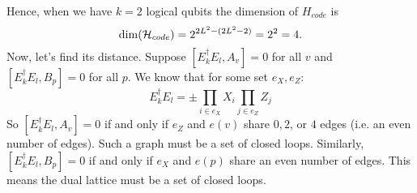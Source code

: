 Hence, when we have $k = 2$ logical qubits the dimension of $H_{code}$ is 
\[\dim (\operatorname{\mathcal{H}}_{code}) = 2^{2L^2 - (2L^2 - 2)} = 2^2 = 4.\] 
Now, let's find its distance.
Suppose $[E_k^{\dagger} E_l, A_v] = 0$ for all $v$ and $[E_k^{\dagger} E_l, B_p] = 0$ for all $p$. We know that for some set $e_X, e_Z$:
\[ E_k^{\dagger} E_l = \pm \prod_{i \in e_X} X_i \prod_{j \in e_Z} Z_j \]
So $[E_k^{\dagger} E_l, A_v] = 0$ if and only if $e_Z$ and $e(v)$ share $0, 2$, or $4$ edges (i.e. an even number of edges).
Such a graph must be a set of closed loops. Similarly, $[E_k^{\dagger} E_l, B_p] = 0$ if and only if $e_X$ and $e(p)$
share an even number of edges. This means the dual lattice must be a set of closed loops.
